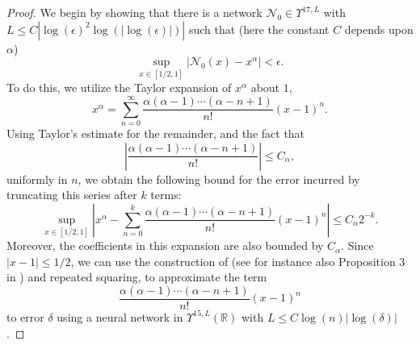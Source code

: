 \documentclass[twoside,11pt]{article}
\begin{document}
\begin{proof}
	We begin by showing that there is a network $\mathcal{N}_0\in \Upsilon^{17,L}$ with $L \leq C|\log(\epsilon)^2\log( |\log(\epsilon)|)|$ such that (here the constant $C$ depends upon $\alpha$)
	\begin{equation}
		\sup_{x\in [1/2,1]}|\mathcal{N}_0(x) - x^\alpha| < \epsilon.
	\end{equation}
	To do this, we utilize the Taylor expansion of $x^{\alpha}$ about $1$,
	\begin{equation}
		x^\alpha = \sum_{n=0}^\infty \frac{\alpha(\alpha - 1)\cdots (\alpha - n+1)}{n!}(x-1)^n.
	\end{equation}
	Using Taylor's estimate for the remainder, and the fact that
    \begin{equation}
		\left|\frac{\alpha(\alpha - 1)\cdots (\alpha - n + 1)}{n!}\right| \leq C_\alpha,
	\end{equation}
	uniformly in $n$, we obtain the following bound for the error incurred by truncating this series after $k$ terms:
	\begin{equation}
		\sup_{x\in [1/2,1]}\left|x^\alpha - \sum_{n=0}^k \frac{\alpha(\alpha - 1)\cdots (\alpha - n + 1)}{n!}(x-1)^n\right| \leq C_\alpha2^{-k}.
	\end{equation}
	Moreover, the coefficients in this expansion are also bounded by $C_\alpha$.
	 Since $|x - 1| \leq 1/2$, we can use the construction of \cite{yarotsky2017error} (see for instance also Proposition 3 in \cite{siegel2023optimal}) and repeated squaring, to approximate the term
	\begin{equation}
		\frac{\alpha(\alpha - 1)\cdots (\alpha - n + 1)}{n!}(x-1)^n
	\end{equation}
	to error $\delta$ using a neural network in $\Upsilon^{15,L}(\mathbb{R})$ with $L \leq C\log(n)|\log(\delta)|$.
    

\end{proof}
\end{document}
